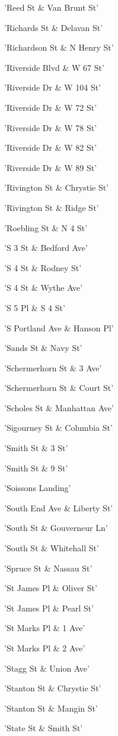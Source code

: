 \documentclass[11pt]{article}
\begin{document}
\begin{enumerate*}
\item 'Reed St \& Van Brunt St'
\item 'Richards St \& Delavan St'
\item 'Richardson St \& N Henry St'
\item 'Riverside Blvd \& W 67 St'
\item 'Riverside Dr \& W 104 St'
\item 'Riverside Dr \& W 72 St'
\item 'Riverside Dr \& W 78 St'
\item 'Riverside Dr \& W 82 St'
\item 'Riverside Dr \& W 89 St'
\item 'Rivington St \& Chrystie St'
\item 'Rivington St \& Ridge St'
\item 'Roebling St \& N 4 St'
\item 'S 3 St \& Bedford Ave'
\item 'S 4 St \& Rodney St'
\item 'S 4 St \& Wythe Ave'
\item 'S 5 Pl \& S 4 St'
\item 'S Portland Ave \& Hanson Pl'
\item 'Sands St \& Navy St'
\item 'Schermerhorn St \& 3 Ave'
\item 'Schermerhorn St \& Court St'
\item 'Scholes St \& Manhattan Ave'
\item 'Sigourney St \& Columbia St'
\item 'Smith St \& 3 St'
\item 'Smith St \& 9 St'
\item 'Soissons Landing'
\item 'South End Ave \& Liberty St'
\item 'South St \& Gouverneur Ln'
\item 'South St \& Whitehall St'
\item 'Spruce St \& Nassau St'
\item 'St James Pl \& Oliver St'
\item 'St James Pl \& Pearl St'
\item 'St Marks Pl \& 1 Ave'
\item 'St Marks Pl \& 2 Ave'
\item 'Stagg St \& Union Ave'
\item 'Stanton St \& Chrystie St'
\item 'Stanton St \& Mangin St'
\item 'State St \& Smith St'

\end{enumerate*}
\end{document}
